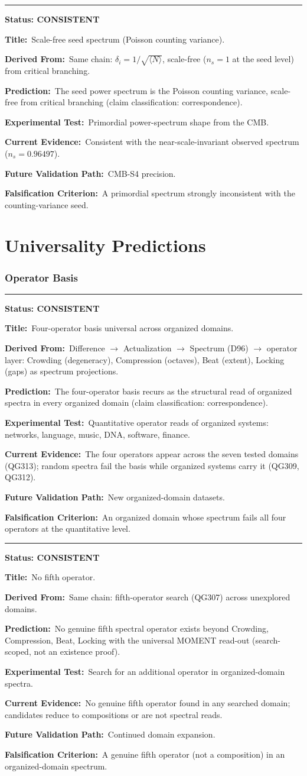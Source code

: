 \documentclass[11pt,a4paper]{article}
\newcommand{\predstart}[2]{%
  \par\medskip\noindent\hrule\par\smallskip
  \noindent{\large\bfseries #1}\hfill{\bfseries Status: #2}\par\smallskip
}
\newcommand{\pfield}[2]{%
  \noindent\textbf{#1:}~#2\par\smallskip
}
\begin{document}
\predstart{AT-P032}{CONSISTENT}
\pfield{Title}{Scale-free seed spectrum (Poisson counting variance).}
\pfield{Derived From}{Same chain: $\delta_i = 1/\sqrt{\langle N\rangle}$, scale-free
($n_s = 1$ at the seed level) from critical branching.}
\pfield{Prediction}{The seed power spectrum is the Poisson counting variance, scale-free from
critical branching (claim classification: correspondence).}
\pfield{Experimental Test}{Primordial power-spectrum shape from the CMB.}
\pfield{Current Evidence}{Consistent with the near-scale-invariant observed spectrum
($n_s = 0.96497$).}
\pfield{Future Validation Path}{CMB-S4 precision.}
\pfield{Falsification Criterion}{A primordial spectrum strongly inconsistent with the
counting-variance seed.}

\part{Universality Predictions}

\section{Operator Basis}
\label{sec:operators}

\predstart{AT-P033}{CONSISTENT}
\pfield{Title}{Four-operator basis universal across organized domains.}
\pfield{Derived From}{Difference $\to$ Actualization $\to$ Spectrum (D96) $\to$ operator
layer: Crowding (degeneracy), Compression (octaves), Beat (extent), Locking (gaps) as
spectrum projections.}
\pfield{Prediction}{The four-operator basis recurs as the structural read of organized
spectra in every organized domain (claim classification: correspondence).}
\pfield{Experimental Test}{Quantitative operator reads of organized systems: networks,
language, music, DNA, software, finance.}
\pfield{Current Evidence}{The four operators appear across the seven tested domains
(QG313); random spectra fail the basis while organized systems carry it (QG309, QG312).}
\pfield{Future Validation Path}{New organized-domain datasets.}
\pfield{Falsification Criterion}{An organized domain whose spectrum fails all four operators
at the quantitative level.}

\predstart{AT-P034}{CONSISTENT}
\pfield{Title}{No fifth operator.}
\pfield{Derived From}{Same chain: fifth-operator search (QG307) across unexplored domains.}
\pfield{Prediction}{No genuine fifth spectral operator exists beyond {Crowding, Compression,
Beat, Locking} with the universal MOMENT read-out (search-scoped, not an existence proof).}
\pfield{Experimental Test}{Search for an additional operator in organized-domain spectra.}
\pfield{Current Evidence}{No genuine fifth operator found in any searched domain; candidates
reduce to compositions or are not spectral reads.}
\pfield{Future Validation Path}{Continued domain expansion.}
\pfield{Falsification Criterion}{A genuine fifth operator (not a composition) in an
organized-domain spectrum.}
\end{document}
